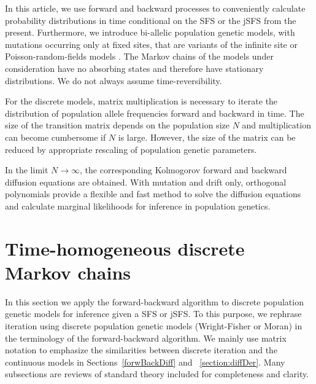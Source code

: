 \documentclass[preprint]{elsarticle}
\begin{document}
In this article, we use forward and backward processes to conveniently calculate probability distributions in time conditional on the SFS or the jSFS from the present. %
Furthermore, we introduce bi-allelic population genetic models, with mutations occurring only at fixed sites, that are variants of the infinite site or Poisson-random-fields models \citep{Kimu69,Sawy92}. The Markov chains of the models under consideration have no absorbing states and therefore have stationary distributions. We do not always assume time-reversibility.

For the discrete models, matrix multiplication is necessary to iterate the distribution of population allele frequencies forward and backward in time. The size of the transition matrix depends on the population size $N$ and multiplication can become cumbersome if $N$ is large. However, the size of the matrix can be reduced by appropriate rescaling of population genetic parameters.

In the limit $N\to\infty$, the corresponding Kolmogorov forward and backward diffusion equations are obtained. With mutation and drift only, orthogonal polynomials provide a flexible and fast method to solve the diffusion equations and calculate marginal likelihoods for inference in population genetics.

\section{Time-homogeneous discrete Markov chains}

In this section we apply the forward-backward algorithm to discrete population genetic models for inference given a SFS or jSFS. To this purpose, we rephrase iteration using discrete population genetic models (Wright-Fisher or Moran) in the terminology of the forward-backward algorithm. We mainly use matrix notation to emphasize the similarities between discrete iteration and the continuous models in Sections~\ref{forwBackDiff} and ~\ref{section:diffDer}. Many subsections are reviews of standard theory included for completeness and clarity. 
\end{document}
